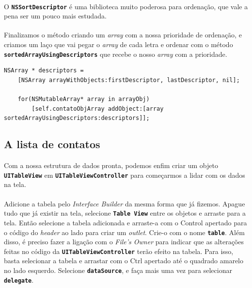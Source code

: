 \documentclass[a4paper,12pt,brazil,doubleside]{book}
\begin{document}
\paragraph{}O \texttt{\textbf{NSSortDescriptor}} é uma biblioteca muito poderosa para ordenação, que vale a pena ser um pouco mais estudada.

\pagebreak

\paragraph{}Finalizamos o método criando um \emph{array} com a nossa prioridade de ordenação, e criamos um laço que vai pegar o \emph{array} de cada letra e ordenar com o método \texttt{\textbf{sortedArrayUsingDescriptors}} que recebe o nosso \emph{array} com a prioridade.

\begin{listing}
\begin{verbatim}
NSArray * descriptors =
    [NSArray arrayWithObjects:firstDescriptor, lastDescriptor, nil];
      
    for(NSMutableArray* array in arrayObj)
        [self.contatoObjArray addObject:[array sortedArrayUsingDescriptors:descriptors]];
\end{verbatim}
\end{listing}

\bigskip

\subsection{A lista de contatos}

\paragraph{}Com a nossa estrutura de dados pronta, podemos enfim criar um objeto \texttt{\textbf{UITableView}} em \texttt{\textbf{UITableViewController}} para começarmos a lidar com os dados na tela.
\paragraph{}Adicione a tabela pelo \emph{Interface Builder} da mesma forma que já fizemos. Apague tudo que já existir na tela, selecione \texttt{\textbf{Table View}} entre os objetos e arraste para a tela. Então selecione a tabela adicionada e arraste-a com o Control apertado para o código do \emph{header} ao lado para criar um \emph{outlet}. Crie-o com o nome \texttt{\textbf{table}}. Além disso, é preciso fazer a ligação com o \emph{File's Owner} para indicar que as alterações feitas no código da \texttt{\textbf{UITableViewController}} terão efeito na tabela. Para isso, basta selecionar a tabela e arrastar com o Ctrl apertado até o quadrado amarelo no lado esquerdo. Selecione \texttt{\textbf{dataSource}}, e faça mais uma vez para selecionar \texttt{\textbf{delegate}}.
\end{document}
